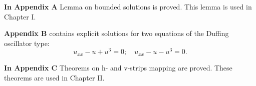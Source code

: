 \documentclass[candidate, href, colorlinks]{disser}
\begin{document}
\textbf{In Appendix A} Lemma on bounded solutions is proved.
This lemma is used in Chapter I.

\textbf{Appendix B} contains explicit solutions for two equations of the Duffing oscillator type: 
\begin{equation}
	u_{xx} - u + u^3 = 0; \quad u_{xx} - u - u^3 = 0.
\end{equation}

\textbf{In Appendix C} Theorems on h- and v-strips mapping are proved.
These theorems are used in Chapter II.


\def\thispagestyle#1{}
\renewcommand{\bibname}{\protect\leftline{\large List of Publications on the Topic of Dissertation}}
\printbibliography[keyword=own]


\end{document}
